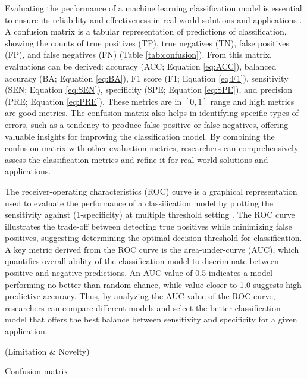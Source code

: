 \documentclass[11pt, a4paper, onecolumn, oneside]{report}
\begin{document}
        Evaluating the performance of a machine learning classification model is essential to ensure its reliability and effectiveness in real-world solutions and applications \cite{classification-evaluation-1, classification-evaluation-5, classification-evaluation-6}. A confusion matrix is a tabular representation of predictions of classification, showing the counts of true positives (TP), true negatives (TN), false positives (FP), and false negatives (FN) (Table \ref{tab:confusion}). From this matrix, evaluations can be derived: accuracy (ACC; Equation \ref{eq:ACC}), balanced accuracy (BA; Equation \ref{eq:BA}), F1 score (F1; Equation \ref{eq:F1}), sensitivity (SEN; Equation \ref{eq:SEN}), specificity (SPE; Equation \ref{eq:SPE}), and precision (PRE; Equation \ref{eq:PRE}). These metrics are in $[0, 1]$ range and high metrics are good metrics. The confusion matrix also helps in identifying specific types of errors, such as a tendency to produce false positive or false negatives, offering valuable insights for improving the classification model. By combining the confusion matrix with other evaluation metrics, researchers can comprehensively assess the classification metrics and refine it for real-world solutions and applications.

        The receiver-operating characteristics (ROC) curve is a graphical representation used to evaluate the performance of a classification model by plotting the sensitivity against (1-specificity) at multiple threshold setting \cite{classification-evaluation-2, classification-evaluation-3, classification-evaluation-4}. The ROC curve illustrates the trade-off between detecting true positives while minimizing false positives, suggesting determining the optimal decision threshold for classification. A key metric derived from the ROC curve is the area-under-curve (AUC), which quantifies overall ability of the classification model to discriminate between positive and negative predictions. An AUC value of 0.5 indicates a model performing no better than random chance, while value closer to 1.0 suggests high predictive accuracy. Thus, by analyzing the AUC value of the ROC curve, researchers can compare different models and select the better classification model that offers the best balance between sensitivity and specificity for a given application.

        (Limitation \& Novelty)

        \begin{table}[p]
            \centering
            \caption{Confusion matrix}
            \label{tab:confusion}
            
        \end{table}
        \clearpage
\end{document}

